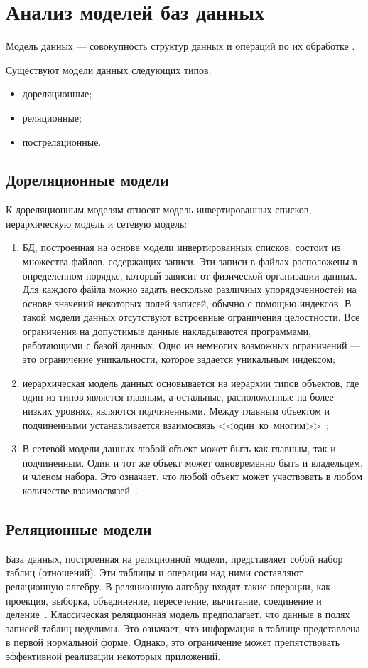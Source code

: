 \section{Анализ моделей баз данных}
Модель данных --- совокупность структур данных и операций по их обработке \cite{dbms}.

Существуют модели данных следующих типов:
\begin{itemize}
	\item дореляционные;
	\item реляционные;
	\item постреляционные.
\end{itemize}

\subsection{Дореляционные модели}
К дореляционным моделям относят модель инвертированных списков, иерархическую модель и сетевую модель:

\begin{enumerate}
	\item БД, построенная на основе модели инвертированных списков, состоит из множества файлов, содержащих записи.
	Эти записи в файлах расположены в определенном порядке, который зависит от физической организации данных.
	Для каждого файла можно задать несколько различных упорядоченностей на основе значений некоторых полей записей, обычно с помощью индексов.
	В такой модели данных отсутствуют встроенные ограничения целостности.
	Все ограничения на допустимые данные накладываются программами, работающими с базой данных.
	Одно из немногих возможных ограничений --- это ограничение уникальности, которое задается уникальным индексом;
	
	\item иерархическая модель данных основывается на иерархии типов объектов, где один из типов является главным, а остальные, расположенные на более низких уровнях, являются подчиненными.
	Между главным объектом и подчиненными устанавливается взаимосвязь <<один~ко~многим>>~\cite{dbms};
	
	\item В сетевой модели данных любой объект может быть как главным, так и подчиненным. Один и тот же объект может одновременно быть и владельцем, и членом набора.
	Это означает, что любой объект может участвовать в любом количестве взаимосвязей~\cite{dbms}.
\end{enumerate}

\subsection{Реляционные модели}
База данных, построенная на реляционной модели, представляет собой набор таблиц (отношений).
Эти таблицы и операции над ними составляют реляционную алгебру.
В реляционную алгебру входят такие операции, как проекция, выборка, объединение, пересечение, вычитание, соединение и деление~\cite{dbms}.
Классическая реляционная модель предполагает, что данные в полях записей таблиц неделимы.
Это означает, что информация в таблице представлена в первой нормальной форме. Однако, это ограничение может препятствовать эффективной реализации некоторых приложений.

